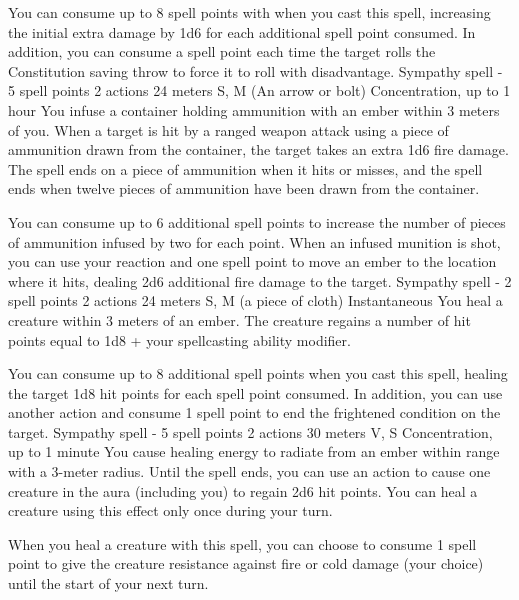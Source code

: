         You can consume up to 8 spell points with when you cast this spell, increasing the initial extra damage by 1d6 for each additional spell point consumed.
        In addition, you can consume a spell point each time the target rolls the Constitution saving throw to force it to roll with disadvantage.
        {Sympathy spell - 5 spell points}
        {2 actions}
        {24 meters}
        {S, M (An arrow or bolt)}
        {Concentration, up to 1 hour}
        You infuse a container holding ammunition with an ember within 3 meters of you.
        When a target is hit by a ranged weapon attack using a piece of ammunition drawn from the container, the target takes an extra 1d6 fire damage.
        The spell ends on a piece of ammunition when it hits or misses, and the spell ends when twelve pieces of ammunition have been drawn from the container.

        You can consume up to 6 additional spell points to increase the number of pieces of ammunition infused by two for each point.
        When an infused munition is shot, you can use your reaction and one spell point to move an ember to the location where it hits, dealing 2d6 additional fire damage to the target.
        {Sympathy spell - 2 spell points}
        {2 actions}
        {24 meters}
        {S, M (a piece of cloth)}
        {Instantaneous}
        You heal a creature within 3 meters of an ember.
        The creature regains a number of hit points equal to 1d8 + your spellcasting ability modifier.

        You can consume up to 8 additional spell points when you cast this spell, healing the target 1d8 hit points for each spell point consumed.
        In addition, you can use another action and consume 1 spell point to end the frightened condition on the target.
        {Sympathy spell - 5 spell points}
        {2 actions}
        {30 meters}
        {V, S}
        {Concentration, up to 1 minute}
        You cause healing energy to radiate from an ember within range with a 3-meter radius.
        Until the spell ends, you can use an action to cause one creature in the aura (including you) to regain 2d6 hit points.
        You can heal a creature using this effect only once during your turn.

        When you heal a creature with this spell, you can choose to consume 1 spell point to give the creature resistance against fire or cold damage (your choice) until the start of your next turn.
